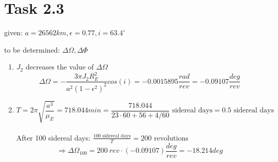 \documentclass[a4paper,12pt]{article}
\begin{document}
\section*{Task 2.3}
given: $a = 26562km, \epsilon = 0.77, i = 63.4^{\circ}$ 

\noindent to be determined: $\Delta \Omega, \Delta \Phi$

\begin{enumerate}
 \item $J_2$ decreases the value of $\Delta \Omega$ \[\Delta\Omega = -\frac{3\pi J_2R_E^2}{a^2(1-\epsilon^2)^2}cos(i) = -0.0015895 \frac{rad}{rev} = -0.09107 \frac{deg}{rev}\]
 \item \[T = 2\pi\sqrt{\frac{a^3}{\mu_E}} = 718.044 min =  \frac{718.044}{23\cdot60+56+4/60}\text{ sidereal days} = 0.5 \text{ sidereal days}\]
 \\ After 100 sidereal days: $\frac{100 \text{ sidereal days}}{T} = 200$ revolutions
 \[\Rightarrow \Delta \Omega_{100} = 200\ rev \cdot (-0.09107) \frac{deg}{rev} = -18.214 deg\]
\end{enumerate}
\end{document}
